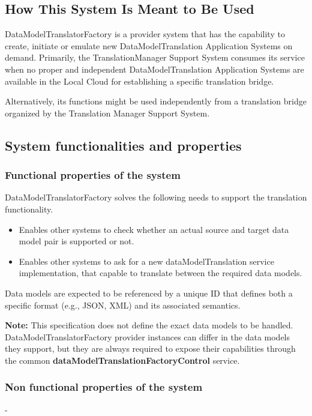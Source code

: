 \documentclass[a4paper]{arrowhead}
\begin{document}
\subsection{How This System Is Meant to Be Used}
\label{sec:use}

DataModelTranslatorFactory is a provider system that has the capability to create, initiate or emulate new DataModelTranslation Application Systems on demand. Primarily, the TranslationManager Support System consumes its service when no proper and independent DataModelTranslation Application Systems are available in the Local Cloud for establishing a specific translation bridge.

Alternatively, its functions might be used independently from a translation bridge organized by the Translation Manager Support System. 

\subsection{System functionalities and properties}
\label{sec:properties}

\subsubsection {Functional properties of the system}
DataModelTranslatorFactory solves the following needs to support the translation functionality.

\begin{itemize}
    \item Enables other systems to check whether an actual source and target data model pair is supported or not. 
    \item Enables other systems to ask for a new dataModelTranslation service implementation, that capable to translate between the required data models. 
\end{itemize}

Data models are expected to be referenced by a unique ID that defines both a specific format (e.g., JSON, XML) and its associated semantics.

\textbf{Note:} This specification does not define the exact data models to be handled. DataModelTranslatorFactory provider instances can differ in the data models they support, but they are always required to expose their capabilities through the common \textbf{dataModelTranslationFactoryControl} service.

\subsubsection {Non functional properties of the system}
-
\end{document}
